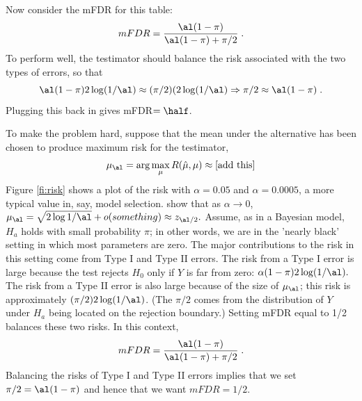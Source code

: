 \documentclass[12pt]{article}
\begin{document}
 Now consider the mFDR for this table:
 \begin{equation}
     mFDR = \frac{\al(1-\pi)}
                 {\al(1-\pi) + \pi/2} \;.
 \label{eq:mfdrtable}
 \end{equation}
 To perform well, the testimator should balance the risk associated with the two
 types of errors, so that 
 \begin{equation}
   \al(1-\pi) 2 \log (1/\al) \approx (\pi/2) (2 \log(1/\al) \Rightarrow   
         \pi/2 \approx \al(1-\pi) \;.
 \label{eq:balance}
 \end{equation}
 Plugging this back in  gives mFDR$=\half$.

 \clearpage

 To make the problem hard, suppose that the mean
 under the alternative has been chosen to produce maximum risk for the
 testimator,
 \begin{equation}
    \mu_\al = \arg \max_\mu R(\hat\mu,\mu) \approx \mbox{[add this]}
 \label{eq:Malpha}
 \end{equation}
 Figure \ref{fi:risk} shows a plot of the risk with $\alpha=0.05$ and
 $\alpha=0.0005$, a more typical value in, say, model selection.
  \citet{fostergeorge94} show that as $\alpha \rightarrow 0$, $\mu_\al = \sqrt{2
 \log 1/\al} + o(something) \approx z_{\al/2}.$ Assume, as in a Bayesian model,
 $H_a$ holds with small probability $\pi$; in other words, we are in the 'nearly
 black' setting in which most parameters are zero.  The major contributions to
 the risk in this setting come from Type I and Type II errors.  The risk from a
 Type I error is large because the test rejects $H_0$ only if $Y$ is far from
 zero: $\alpha (1-\pi) 2 \log(1/\al).$ The risk from a Type II error is also
 large because of the size of $\mu_\al$; this risk is approximately $(\pi/2) 2
 \log(1/\al)$. (The $\pi/2$ comes from the distribution of $Y$ under $H_a$ being
 located on the rejection boundary.)  Setting mFDR equal to 1/2 balances these
two risks.  In this context,
 \begin{equation}
    mFDR = \frac{\al(1-\pi)}
                {\al(1-\pi) + \pi/2} \;.   
 \label{eq:mfdrexample}
 \end{equation}
 Balancing the risks of Type I and Type II errors implies that we set
$\pi/2=\al(1-\pi)$ and hence that we want $mFDR = 1/2$.
\end{document}
